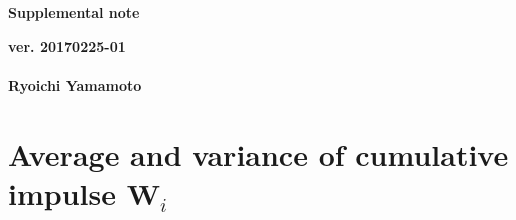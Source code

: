 \documentclass[a4paper,11pt]{article}
\begin{document}
\begin{center}
  {\LARGE\bf Supplemental note}
  \end{center}
\begin{flushright}
  {\large\bf ver. 20170225-01}\\
 \ \\
{\large\bf Ryoichi Yamamoto}\\
\end{flushright}

\section{Average and variance of cumulative impulse $\mathbf{W}_i$}
\end{document}
